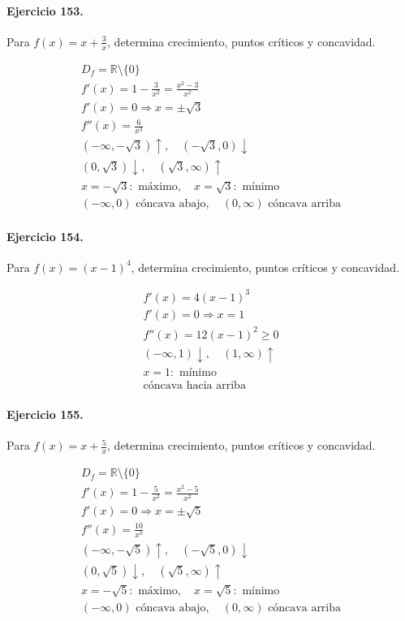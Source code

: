 \documentclass[11pt,a4paper]{article}
\begin{document}
\paragraph{Ejercicio 153.} Para $f(x)=x+\frac{3}{x}$, determina crecimiento, puntos críticos y concavidad.

\[
\begin{aligned}
D_f=\mathbb{R}\setminus\{0\}\\
f'(x)=1-\frac{3}{x^2}=\frac{x^2-3}{x^2}\\
f'(x)=0\Rightarrow x=\pm \sqrt{3}\\
f''(x)=\frac{6}{x^3}\\
(-\infty,-\sqrt{3})\uparrow,\quad(-\sqrt{3},0)\downarrow\\
(0,\sqrt{3})\downarrow,\quad(\sqrt{3},\infty)\uparrow\\
x=-\sqrt{3}:\text{ máximo},\quad x=\sqrt{3}:\text{ mínimo}\\
(-\infty,0)\text{{ cóncava abajo}},\quad(0,\infty)\text{{ cóncava arriba}}
\end{aligned}
\]


\paragraph{Ejercicio 154.} Para $f(x)=(x-1)^4$, determina crecimiento, puntos críticos y concavidad.

\[
\begin{aligned}
f'(x)=4(x-1)^3\\
f'(x)=0\Rightarrow x=1\\
f''(x)=12(x-1)^2\ge0\\
(-\infty,1)\downarrow,\quad(1,\infty)\uparrow\\
x=1:\text{ mínimo}\\
\text{{cóncava hacia arriba}}
\end{aligned}
\]


\paragraph{Ejercicio 155.} Para $f(x)=x+\frac{5}{x}$, determina crecimiento, puntos críticos y concavidad.

\[
\begin{aligned}
D_f=\mathbb{R}\setminus\{0\}\\
f'(x)=1-\frac{5}{x^2}=\frac{x^2-5}{x^2}\\
f'(x)=0\Rightarrow x=\pm \sqrt{5}\\
f''(x)=\frac{10}{x^3}\\
(-\infty,-\sqrt{5})\uparrow,\quad(-\sqrt{5},0)\downarrow\\
(0,\sqrt{5})\downarrow,\quad(\sqrt{5},\infty)\uparrow\\
x=-\sqrt{5}:\text{ máximo},\quad x=\sqrt{5}:\text{ mínimo}\\
(-\infty,0)\text{{ cóncava abajo}},\quad(0,\infty)\text{{ cóncava arriba}}
\end{aligned}
\]
\end{document}
